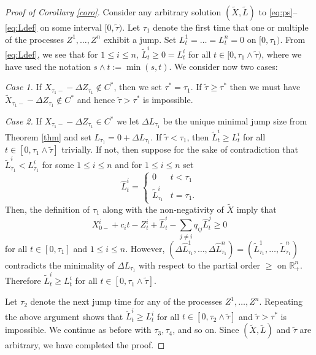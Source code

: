 \documentclass[10pt,a4paper]{amsart}
\newcommand{\R}{\mathbb{R}}
\newcommand{\wh}{\widehat}
\newcommand{\wt}{\widetilde}
\begin{document}
\begin{proof}[Proof of Corollary \ref{coro}]
Consider any arbitrary solution  $(\wt{X},\wt{L})$ to \eqref{eq:ps}--\eqref{eq:Ldef} on some interval $[0,\wt\tau)$.
Let $\tau_1$ denote the first time that one or multiple of the processes $Z^1,\dots,Z^n$ exhibit a jump. Set $L^1_t=\dots =L^n_t=0$ on $[0,\tau_1)$. From \eqref{eq:Ldef}, we see that for $1\le i\le n$, $\wt{L}^i_t\ge 0=L^i_t$ for all $t\in [0,\tau_1\wedge \wt\tau)$, where we have used the notation $s\wedge t:=\min(s,t)$. We consider now two cases:

\medskip

\emph{Case 1.} If $X_{\tau_1-}-\Delta Z_{\tau_1} \notin C^*$, then we set $\tau^*=\tau_1$. If $\wt\tau \ge \tau^*$ then we must have $\wt{X}_{\tau_1-}-\Delta Z_{\tau_1} \notin C^*$ and hence $\wt\tau > \tau^*$ is impossible.

\medskip

\emph{Case 2.} If $X_{\tau_1-}-\Delta Z_{\tau_1} \in C^*$ we let $\Delta L_{\tau_1}$ be the unique minimal jump size from Theorem \ref{thm} and set $L_{\tau_1}=0+\Delta L_{\tau_1}$.
If $\wt\tau < \tau_1$, then $\wt{L}^i_t\ge L^i_t$ for all $t\in [0,\tau_1\wedge \wt\tau]$ trivially. If not, then suppose for the sake of contradiction that $\wt{L}^i_{\tau_1}< L^i_{\tau_1}$ for some $1\le i\le n$ and for $1\le i \le n$ set 
\begin{equation*}
\wh{L}^i_t=\begin{cases}
0&t<\tau_1\\
\wt{L}^i_{\tau_1} & t=\tau_1.
\end{cases}
\end{equation*}
Then, the definition of $\tau_1$ along with the non-negativity of $\wt{X}$ imply that
\begin{equation*}
X_{0-}^i+c_it-Z^i_t+\wh{L}^i_t-\sum_{j\neq i}q_{ij} \wh{L}^j_t\ge 0
\end{equation*}
for all $t\in[0,\tau_1]$ and $1\le i\le n$. However, $(\Delta\wh{L}^1_{\tau_1},\dots,\Delta\wh{L}^n_{\tau_1})=(\wt{L}^1_{\tau_1},\dots, \wt{L}^n_{\tau_1})$ contradicts the minimality of $\Delta L_{\tau_1}$ with respect to the partial order $\ge$ on $\R_+^n$. Therefore $\wt{L}^i_t\ge L^i_t$ for all $t\in [0,\tau_1\wedge \wt\tau]$. 

\medskip

Let $\tau_2$ denote the next jump time for any of the processes $Z^1,\dots,Z^n$. Repeating the above argument shows that $\wt{L}^i_t\ge L^i_t$ for all $t\in [0,\tau_2\wedge \wt\tau]$ and $\wt\tau > \tau^*$ is impossible. We continue as before with $\tau_3,\tau_4$, and so on. Since $(\wt{X},\wt{L})$ and $\wt\tau$ are arbitrary, we have completed the proof. \qedhere
\end{proof}
\end{document}

